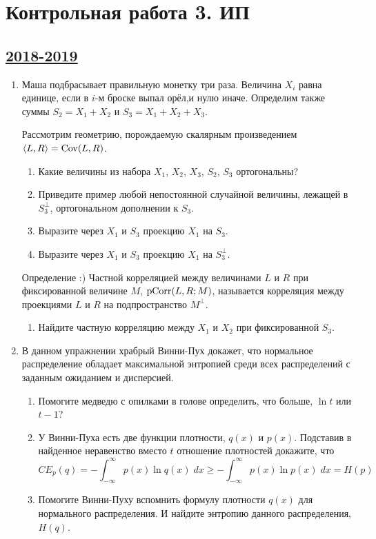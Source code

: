 \newpage
\thispagestyle{empty}
\section{Контрольная работа 3. ИП}


\subsection[2018-2019]{\hyperref[sec:sol_kr_03_ip_2018_2019]{2018-2019}}
\label{sec:kr_03_ip_2018_2019}


\begin{enumerate}
\item Маша подбрасывает правильную монетку три раза. Величина $X_i$ равна единице,
если в $i$-м броске выпал орёл,и нулю иначе. Определим также суммы $S_2 = X_1 + X_2$
и $S_3 = X_1 + X_2 + X_3$.

Рассмотрим геометрию, порождаемую скалярным произведением $\langle L, R\rangle = \operatorname{Cov}(L, R)$.



\begin{enumerate}
  \item Какие величины из набора $X_1$, $X_2$, $X_3$, $S_2$, $S_3$ ортогональны?
  \item Приведите пример любой непостоянной случайной величины, лежащей в $S_3^{\perp}$, ортогональном дополнении к $S_3$.
  \item Выразите через $X_1$ и $S_3$ проекцию $X_1$ на $S_3$.
  \item Выразите через $X_1$ и $S_3$ проекцию $X_1$ на $S_3^{\perp}$.
\end{enumerate}

Определение :) Частной корреляцией между величинами $L$ и $R$ при фиксированной величине $M$,
$\operatorname{pCorr}(L, R; M)$, называется корреляция между проекциями $L$ и $R$ на подпространство $M^{\perp}$.

\begin{enumerate}[resume]
  \item Найдите частную корреляцию между $X_1$ и $X_2$ при фиксированной $S_3$.
\end{enumerate}

\item В данном упражнении храбрый Винни-Пух докажет, что нормальное распределение
обладает максимальной энтропией среди всех распределений с заданным ожиданием и дисперсией.

\begin{enumerate}
  \item Помогите медведю с опилками в голове определить, что больше, $\ln t$ или $t-1$?
  \item У Винни-Пуха есть две функции плотности, $q(x)$ и $p(x)$.
  Подставив в найденное неравенство вместо $t$ отношение плотностей докажите, что
\[
 CE_p(q) = - \int_{-\infty}^{\infty} p(x) \ln q(x) \; dx \geq  - \int_{-\infty}^{\infty} p(x) \ln p(x) \; dx = H(p)
\]
\item Помогите Винни-Пуху вспомнить формулу плотности $q(x)$ для нормального распределения.
И найдите энтропию данного распределения, $H(q)$.


\end{enumerate}
\end{enumerate}
